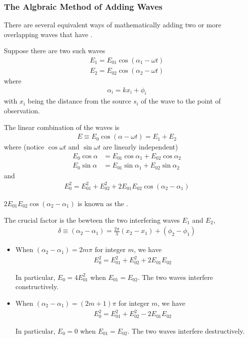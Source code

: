 \subsubsection{The Algbraic Method of Adding Waves}
There are several equivalent ways of mathematically adding two or more overlapping waves that have . 

Suppose there are two such waves 
\begin{align*}
    E_1=E_{01}\cos\left( \alpha_1-\omega t \right)\\
    E_2=E_{02}\cos\left( \alpha_2-\omega t \right)
\end{align*}
where 
\begin{align*}
    \alpha_i=kx_i+\phi_i
\end{align*}
with $x_i$ being the distance from the source $s_i$ of the wave to the point of observation. 

The linear combination of the waves is 
\begin{align*}
    E\equiv E_0\cos\left( \alpha-\omega t \right) = E_1+E_2
\end{align*}
where (notice $\cos\omega t$ and $\sin\omega t$ are linearly independent)
\begin{align*}
    E_0\cos \alpha &=E_{01}\cos\alpha_1+E_{02}\cos\alpha_2\\
    E_0\sin \alpha &=E_{01}\sin\alpha_1+E_{02}\sin\alpha_2
\end{align*}
and
\begin{align*}
    E_0^2=E_{01}^2+E_{02}^2+2E_{01}E_{02}\cos\left( \alpha_2-\alpha_1 \right)
\end{align*}

$2E_{01}E_{02}\cos\left( \alpha_2-\alpha_1 \right)$ is known as the .

The crucial factor is the  bewteen the two interfering waves $E_1$ and $E_2$, 
\begin{align*}
    \delta \equiv \left( \alpha_2-\alpha_1 \right)=\frac{2\pi}{\lambda}(x_2-x_1)+(\phi_2-\phi_1)
\end{align*}

\begin{itemize}
    \item When $\left( \alpha_2-\alpha_1 \right)=2m\pi$ for integer $m$, we have 
    \begin{align*}
        E_0^2=E_{01}^2+E_{02}^2+2E_{01}E_{02}
    \end{align*}

    In particular, $E_0=4E_{01}^2$ when $E_{01}=E_{02}$. The two waves interfere constructively. 
    \item When $\left( \alpha_2-\alpha_1 \right)=(2m+1)\pi$ for integer $m$, we have
    \begin{align*}
        E_0^2=E_{01}^2+E_{02}^2-2E_{01}E_{02}
    \end{align*}

    In particular, $E_0=0$ when $E_{01}=E_{02}$. The two waves interfere destructively. 
\end{itemize}

